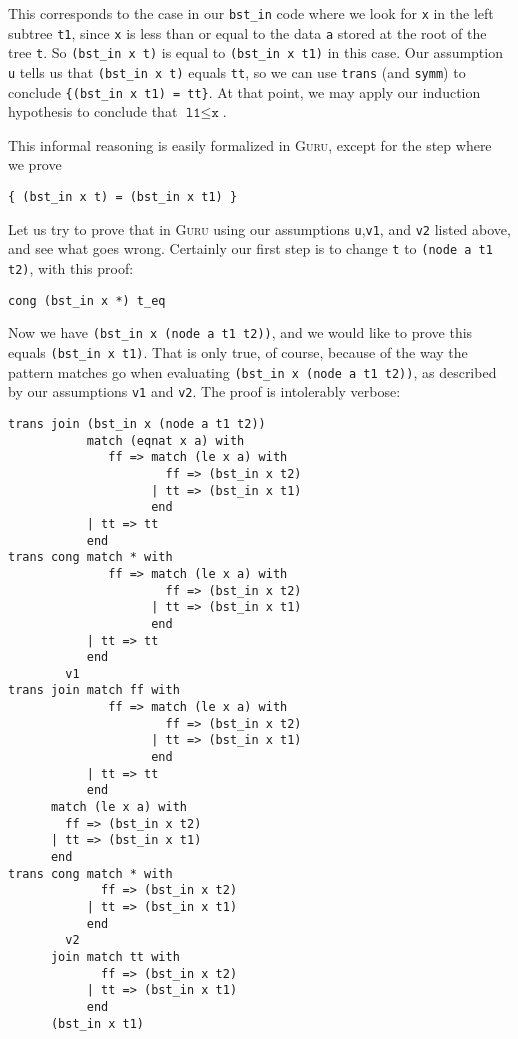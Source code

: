 \documentclass{book}[12pt]
\newcommand{\guru}[0]{\textsc{Guru}\xspace}
\begin{document}
\noindent This corresponds to the case in our \texttt{bst\_in} code
where we look for \texttt{x} in the left subtree \texttt{t1}, since
\texttt{x} is less than or equal to the data \texttt{a} stored at the
root of the tree \texttt{t}.  So \texttt{(bst\_in x t)} is equal to
\texttt{(bst\_in x t1)} in this case.  Our assumption \texttt{u} tells
us that \texttt{(bst\_in x t)} equals \texttt{tt}, so we can use
\texttt{trans} (and \texttt{symm}) to conclude \texttt{\{(bst\_in x
t1) = tt\}}.  At that point, we may apply our induction hypothesis to
conclude that $\texttt{l1} \le \texttt{x}$.

This informal reasoning is easily formalized in \guru, except for the
step where we prove

\begin{verbatim}
{ (bst_in x t) = (bst_in x t1) }
\end{verbatim}

\noindent Let us try to prove that in \guru using our assumptions
\texttt{u},\texttt{v1}, and \texttt{v2} listed above, and see what
goes wrong.  Certainly our first step is to change \texttt{t} to
\texttt{(node a t1 t2)}, with this proof:

\begin{verbatim}
cong (bst_in x *) t_eq
\end{verbatim}

\noindent Now we have \texttt{(bst\_in x (node a t1 t2))}, and we would
like to prove this equals \texttt{(bst\_in x t1)}.  That is only true,
of course, because of the way the pattern matches go when evaluating
\texttt{(bst\_in x (node a t1 t2))}, as described by our assumptions
\texttt{v1} and \texttt{v2}.  The proof is intolerably verbose:

{\small
\begin{verbatim}
trans join (bst_in x (node a t1 t2)) 
           match (eqnat x a) with
              ff => match (le x a) with
                      ff => (bst_in x t2)
                    | tt => (bst_in x t1)
                    end
           | tt => tt
           end
trans cong match * with
              ff => match (le x a) with
                      ff => (bst_in x t2)
                    | tt => (bst_in x t1)
                    end
           | tt => tt
           end
        v1
trans join match ff with
              ff => match (le x a) with
                      ff => (bst_in x t2)
                    | tt => (bst_in x t1)
                    end
           | tt => tt
           end
      match (le x a) with
        ff => (bst_in x t2)
      | tt => (bst_in x t1)
      end
trans cong match * with
             ff => (bst_in x t2)
           | tt => (bst_in x t1)
           end
        v2
      join match tt with
             ff => (bst_in x t2)
           | tt => (bst_in x t1)
           end
      (bst_in x t1)         
\end{verbatim}
}
\end{document}
